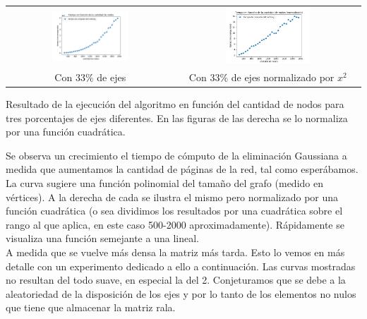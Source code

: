 \begin{minipage}{\textwidth}
\begin{center}
\begin{tabular}{cc}
      \includegraphics[width=0.475\textwidth]{img/tiempo_nodos_prop_500-2000_solo_e3.png} 
       & \includegraphics[width=0.475\textwidth]{img/tiempo_nodos_prop_500-2000-normalizado-e3.png} \\
             Con $33\%$ de ejes & Con $33\%$ de ejes normalizado por $x^{2}$ \\
                    \end{tabular}

                    \vspace{1em}

Resultado de la ejecución del algoritmo en función del cantidad de nodos para tres porcentajes de ejes diferentes. En las figuras de las derecha se lo normaliza por una función cuadrática.

                    \vspace{1em}
                \end{center}
                \label{fig:exp1-nodos}
            \end{minipage}

Se observa un crecimiento el tiempo de cómputo de la eliminación Gaussiana a medida que aumentamos la cantidad de páginas de la red, tal como esperábamos. La curva sugiere una función polinomial del tamaño del grafo (medido en vértices). A la derecha de cada se ilustra el mismo pero normalizado por una función cuadrática (o sea dividimos los resultados por una cuadrática sobre el rango al que aplica, en este caso 500-2000 aproximadamente). Rápidamente se visualiza una función semejante a una lineal.\\

A medida que se vuelve más densa la matriz más tarda. Esto lo vemos en más detalle con un experimento dedicado a ello a continuación. Las curvas mostradas no resultan del todo suave, en especial la del 2. Conjeturamos que se debe a la aleatoriedad de la disposición de los ejes y por lo tanto de los elementos no nulos que tiene que almacenar la matriz rala. \\

